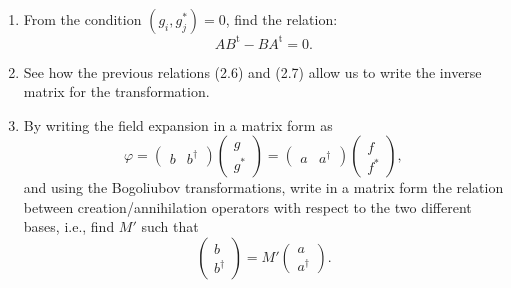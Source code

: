 \documentclass[10pt,a4paper]{article}
\theoremstyle{definition}
\begin{document}
{\begin{enumerate}
\item From the condition $(g_i, g_j^*) = 0$, find the relation:
\begin{equation}
A B^{\mathrm{t}} - B A^{\mathrm{t}} = 0.  \tag{2.7}
\end{equation}

   
\item See how the previous relations (2.6) and (2.7) allow us to write the inverse matrix for the transformation.

\item By writing the field expansion in a matrix form as
\begin{equation}
\varphi = 
        \begin{pmatrix}
            b & b^\dagger
        \end{pmatrix}
        \begin{pmatrix}
            g \\ g^*
        \end{pmatrix}
        = 
        \begin{pmatrix}
            a & a^\dagger
        \end{pmatrix}
        \begin{pmatrix}
            f \\ f^*
        \end{pmatrix},
        \tag{2.8}
\end{equation}
and using the Bogoliubov transformations, write in a matrix form the relation between creation/annihilation operators with respect to the two different bases, i.e., find $M'$ such that
\begin{equation}
\begin{pmatrix}
   b \\ b^\dagger
\end{pmatrix}
= 
M'
\begin{pmatrix}
   a \\ a^\dagger
\end{pmatrix}. \tag{2.9}
\end{equation}
    
\end{enumerate}

}
\end{document}
